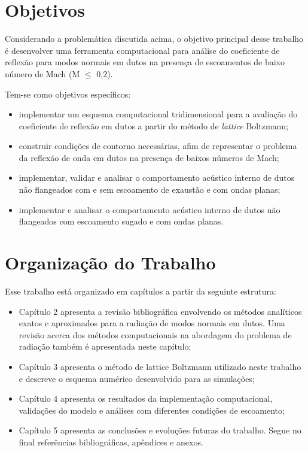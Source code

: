 \section{Objetivos}

Considerando a problemática discutida acima, o objetivo principal desse trabalho é desenvolver uma ferramenta computacional para análise do coeficiente de reflexão para modos normais em dutos na presença de escoamentos de baixo número de Mach (M $\leq$ 0,2).

Tem-se como objetivos específicos:
\begin{itemize}
    \item implementar um esquema computacional tridimensional para a avaliação do coeficiente de reflexão em dutos a partir do método de \textit{lattice} Boltzmann;
    \item construir condições de contorno necessárias, afim de representar o problema da reflexão de onda em dutos na presença de baixos números de Mach;
    \item implementar, validar e analisar o comportamento acústico interno de dutos não flangeados com e sem escoamento de exaustão e com ondas planas;
    \item implementar e analisar o comportamento acústico interno de dutos não flangeados com escoamento sugado e com ondas planas.
\end{itemize}

\section{Organização do Trabalho}

Esse trabalho está organizado em capítulos a partir da seguinte estrutura: 

\begin{itemize}
	\item Capítulo 2 apresenta a revisão bibliográfica envolvendo os métodos analíticos exatos e aproximados para a radiação de modos normais em dutos. Uma revisão acerca dos métodos computacionais na abordagem do problema de radiação também é apresentada neste capítulo;
	\item Capítulo 3 apresenta o método de lattice Boltzmann utilizado neste trabalho e descreve o esquema numérico desenvolvido para as simulações;
	\item Capítulo 4 apresenta os resultados da implementação computacional, validações do modelo e análises com diferentes condições de escoamento;
	\item Capítulo 5 apresenta as conclusões e evoluções futuras do trabalho. Segue no final referências bibliográficas, apêndices e anexos.
\end{itemize}